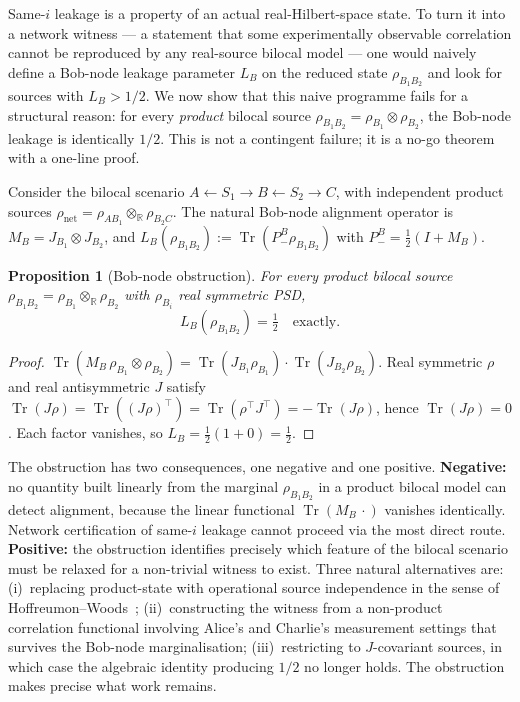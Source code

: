 \documentclass[a4paper,onecolumn,noarxiv]{quantumarticle}
\theoremstyle{plain}
\newtheorem{proposition}[theorem]{Proposition}
\theoremstyle{definition}
\theoremstyle{remark}
\newcommand{\R}{\mathbb{R}}
\newcommand{\Pminus}{P_{-}}
\newcommand{\Mop}{M}
\newcommand{\Tr}{\operatorname{Tr}}
\newcommand{\Lleak}{L}
\begin{document}
Same-$i$ leakage is a property of an actual real-Hilbert-space state. To turn it into
a network witness --- a statement that some experimentally observable correlation
cannot be reproduced by any real-source bilocal model --- one would naively define a
Bob-node leakage parameter $\Lleak_B$ on the reduced state $\rho_{B_1B_2}$ and look
for sources with $\Lleak_B>1/2$. We now show that this naive programme fails for a
structural reason: for every \emph{product} bilocal source
$\rho_{B_1B_2}=\rho_{B_1}\otimes\rho_{B_2}$, the Bob-node leakage is identically
$1/2$. This is not a contingent failure; it is a no-go theorem with a one-line proof.

Consider the bilocal scenario $A\leftarrow S_1\to B\leftarrow S_2\to C$, with
independent product sources $\rho_{\mathrm{net}}=\rho_{AB_1}\otimes_\R\rho_{B_2C}$.
The natural Bob-node alignment operator is $\Mop_B=J_{B_1}\otimes J_{B_2}$, and
$\Lleak_B(\rho_{B_1B_2}):=\Tr(\Pminus^B\rho_{B_1B_2})$ with
$\Pminus^B=\tfrac{1}{2}(I+\Mop_B)$.

\begin{proposition}[Bob-node obstruction]
\label{prop:bobnode}
For every product bilocal source $\rho_{B_1B_2}=\rho_{B_1}\otimes_\R\rho_{B_2}$
with $\rho_{B_i}$ real symmetric PSD,
\begin{equation}
  \Lleak_B(\rho_{B_1B_2}) = \tfrac{1}{2}\quad\text{exactly.}
\end{equation}
\end{proposition}

\begin{proof}
$\Tr(\Mop_B\,\rho_{B_1}\otimes\rho_{B_2})=\Tr(J_{B_1}\rho_{B_1})\cdot\Tr(J_{B_2}\rho_{B_2})$.
Real symmetric $\rho$ and real antisymmetric $J$ satisfy
$\Tr(J\rho)=\Tr((J\rho)^\top)=\Tr(\rho^\top J^\top)=-\Tr(J\rho)$,
hence $\Tr(J\rho)=0$. Each factor vanishes, so
$\Lleak_B=\tfrac{1}{2}(1+0)=\tfrac{1}{2}$.
\end{proof}

The obstruction has two consequences, one negative and one positive.
\textbf{Negative:} no quantity built linearly from the marginal $\rho_{B_1B_2}$
in a product bilocal model can detect alignment, because the linear functional
$\Tr(\Mop_B\,\cdot)$ vanishes identically. Network certification of same-$i$ leakage
cannot proceed via the most direct route.
\textbf{Positive:} the obstruction identifies precisely which feature of the bilocal
scenario must be relaxed for a non-trivial witness to exist. Three natural
alternatives are: (i)~replacing product-state with operational source independence
in the sense of Hoffreumon--Woods~\cite{HoffreumonWoods2025,HoffreumonWoodsNonFalsified};
(ii)~constructing the witness from a non-product correlation functional involving
Alice's and Charlie's measurement settings that survives the Bob-node marginalisation;
(iii)~restricting to $J$-covariant sources, in which case the algebraic identity
producing $1/2$ no longer holds. The obstruction makes precise what work remains.
\end{document}
